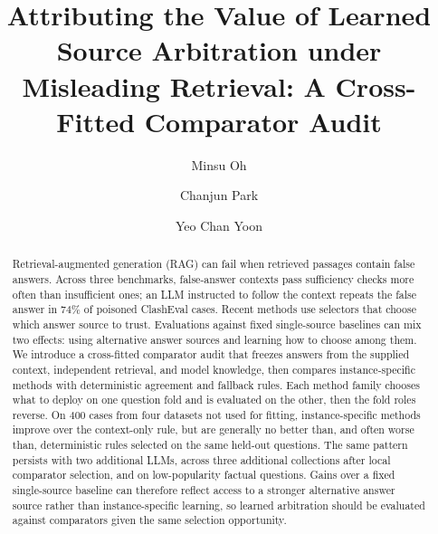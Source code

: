 \documentclass[sigconf]{acmart}
\begin{document}
\title[Attributing Learned Arbitration under Misleading Retrieval]
{Attributing the Value of Learned Source Arbitration under Misleading Retrieval:
A Cross-Fitted Comparator Audit}

\author{Minsu Oh}

\author{Chanjun Park}

\author{Yeo Chan Yoon}
\authornotemark[1]

\begin{abstract}
Retrieval-augmented generation (RAG) can fail when retrieved passages
contain false answers. Across three benchmarks, false-answer contexts
pass sufficiency checks more often than insufficient ones; an LLM
instructed to follow the context repeats the false answer in $74\%$ of
poisoned ClashEval cases. Recent methods use selectors that choose which
answer source to trust. Evaluations against fixed single-source baselines can mix
two effects: using alternative answer sources and learning how to choose
among them. We introduce a cross-fitted comparator audit that freezes
answers from the supplied context, independent retrieval, and model
knowledge, then compares instance-specific methods with deterministic
agreement and fallback rules. Each method family chooses what to deploy
on one question fold and is evaluated on the other, then the fold roles
reverse. On $400$ cases from four datasets not used for fitting,
instance-specific methods improve over the context-only rule, but are
generally no better than, and often worse than, deterministic rules
selected on the same held-out questions. 
The same pattern persists with two additional LLMs, across three
additional collections after local comparator selection, and on
low-popularity factual questions.
Gains over a fixed single-source baseline can therefore reflect access
to a stronger alternative answer source rather than instance-specific
learning, so learned arbitration should be evaluated against comparators
given the same selection opportunity.
\end{abstract}
\end{document}

